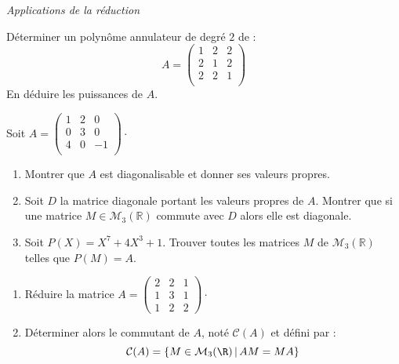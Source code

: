 \documentclass[a4paper,10pt]{report}
\begin{document}
\medskip

\begin{center}
\textit{{ {\large Applications de la réduction}}}
\end{center}

\medskip

\begin{Exa} Déterminer un polynôme annulateur de degré $2$ de :
$$ A = \begin{pmatrix}
1 & 2 & 2 \\
2 & 1 & 2 \\
2 & 2 & 1 \\
\end{pmatrix}$$
En déduire les puissances de $A$. 
\end{Exa}


\begin{Exa}Soit $A= \begin{pmatrix}
1 & 2 & 0 \\
0 & 3 & 0 \\
4 & 0 & -1 \\
\end{pmatrix}\cdot$
\begin{enumerate}
\item Montrer que $A$ est diagonalisable et donner ses valeurs propres.
\item Soit $D$ la matrice diagonale portant les valeurs propres de $A$. Montrer que si une matrice $M \in \mathcal{M}_3(\mathbb{R})$ commute avec $D$ alors elle est diagonale.
\item Soit $P(X)=X^7+ 4X^3+1$. Trouver toutes les matrices $M$ de $\mathcal{M}_3(\mathbb{R})$ telles que $P(M)=A$.
\end{enumerate}
\end{Exa}


\begin{Exa}
\begin{enumerate}
\item R\'eduire la matrice $A= \left(\begin{array}{rrr}  2 & 2 & 1\\
1 & 3 & 1\\
1 & 2 & 2 \end{array}\right) \cdot $\\
\item Déterminer alors le commutant de $A$, noté $\mathcal{C}(A)$ et défini par : 
$${\cal C}(A)=\{M\in{\cal M}_3(\R) \, \vert \, AM=MA\}$$
\end{enumerate}
\end{Exa} 
\end{document}
